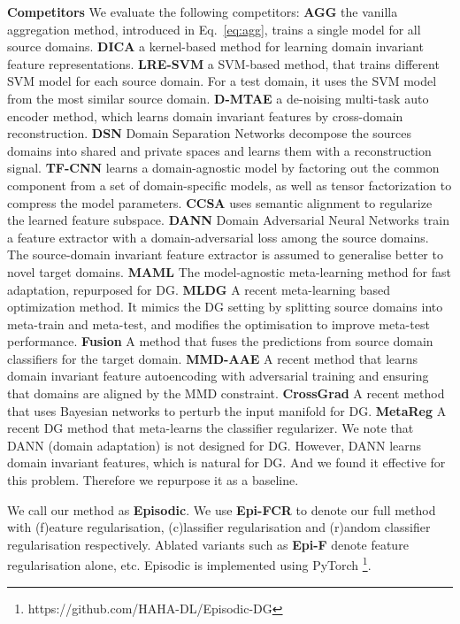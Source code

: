 \documentclass[10pt,twocolumn,letterpaper]{article}
\newcommand{\keypoint}[1]{\vspace{0.1cm}\noindent\textbf{#1}\quad}
\begin{document}
\keypoint{Competitors}
We evaluate the following competitors: \textbf{AGG} the vanilla aggregation method, introduced in Eq.~\ref{eq:agg}, trains a single model for all source domains.
\textbf{DICA} \cite{muandet2013domaingeneralization} a kernel-based method for learning domain invariant feature representations.
\textbf{LRE-SVM} \cite{Xu2014lre} a SVM-based method, that trains different SVM model for each source domain. For a test domain, it uses the SVM model from the most similar source domain.
\textbf{D-MTAE} \cite{Ghifary2015mtae} a de-noising multi-task auto encoder method, which learns  domain invariant features by cross-domain reconstruction.
\textbf{DSN} \cite{bousmalis2016domain} Domain Separation Networks decompose the sources domains into shared and private spaces and learns them with a reconstruction signal. 
\textbf{TF-CNN} \cite{Li2017dg} learns a domain-agnostic model by factoring out the common component from a set of domain-specific models, as well as tensor factorization to compress the model parameters.
\textbf{CCSA} \cite{motiian2017CCSA} uses semantic alignment to regularize the learned feature subspace.
\textbf{DANN} \cite{ganin2016dann} Domain Adversarial Neural Networks train a feature extractor with a domain-adversarial loss among the source domains. The source-domain invariant feature extractor is assumed to generalise better to novel target domains.
{\textbf{MAML} \cite{finn2017model} The model-agnostic meta-learning method for fast adaptation,  repurposed for DG.}
\textbf{MLDG} \cite{Li2018MLDG} A recent meta-learning based optimization method. It mimics the DG setting by splitting source domains into meta-train and meta-test, and modifies the optimisation to improve meta-test performance.
\textbf{Fusion} \cite{Massimiliano2018ICIP} A method that fuses the predictions from source domain classifiers for the target domain.
\textbf{MMD-AAE} \cite{Li2018mmdaae} A recent method that learns domain invariant feature autoencoding with adversarial training and ensuring that domains are aligned by the MMD constraint.
\textbf{CrossGrad} \cite{shankar2018generalizing} A recent method that uses Bayesian networks to perturb the input manifold for DG.
\textbf{MetaReg} \cite{NIPS2018_metareg} A recent DG method that meta-learns the classifier regularizer.
We note that DANN (domain adaptation) is not designed for DG. However, DANN learns domain invariant features, which is natural for DG. And we found it effective for this problem. Therefore we repurpose it as a baseline.

We call our method as \textbf{Episodic}. We use \textbf{Epi-FCR} to denote our full method with (f)eature regularisation, (c)lassifier regularisation and (r)andom classifier regularisation respectively. Ablated variants such as \textbf{Epi-F} denote feature regularisation alone, etc. Episodic is implemented using PyTorch \footnote{https://github.com/HAHA-DL/Episodic-DG}.
\end{document}

